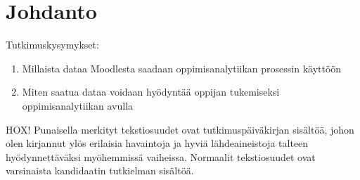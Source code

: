 \chapter{Johdanto\label{johdanto}}

Tutkimuskysymykset:
\begin{enumerate}
    \item Millaista dataa Moodlesta saadaan oppimisanalytiikan prosessin käyttöön
    \item Miten saatua dataa voidaan hyödyntää oppijan tukemiseksi oppimisanalytiikan avulla
\end{enumerate}

HOX! Punaisella merkityt tekstiosuudet ovat tutkimuspäiväkirjan sisältöä, johon olen kirjannut ylös erilaisia havaintoja ja hyviä lähdeaineistoja talteen hyödynnettäväksi myöhemmissä vaiheissa. Normaalit tekstiosuudet ovat varsinaista kandidaatin tutkielman sisältöä.
